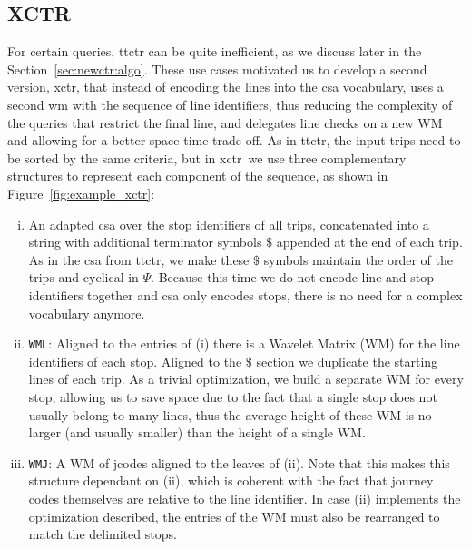     \subsection{XCTR}
    \label{sec:newctr:str:xctr}
    For certain queries, \gls{ttctr} can be quite inefficient, as we discuss later in the Section~\ref{sec:newctr:algo}. These use cases motivated us to develop a second version, \gls{xctr}, that instead of encoding the lines into the \gls{csa} vocabulary, uses a second \gls{wm} with the sequence of line identifiers, thus reducing the complexity of the queries that restrict the final line, and delegates line checks on a new WM and allowing for a better space-time trade-off. As in \gls{ttctr}, the input trips need to be sorted by the same criteria, but in \gls{xctr}~we use three complementary structures to represent each component of the sequence, as shown in Figure~\ref{fig:example_xctr}:
    \begin{enumerate}[(i)]
        \item An adapted \gls{csa} over the stop identifiers of all trips, concatenated into a string with additional terminator symbols $\$$ appended at the end of each trip. As in the \gls{csa} from \gls{ttctr}, we make these $\$$ symbols maintain the order of the trips and cyclical in $\Psi$. Because this time we do not encode line and stop identifiers together and \gls{csa} only encodes stops, there is no need for a complex vocabulary anymore.
        \item \texttt{WML}: Aligned to the entries of (i) there is a Wavelet Matrix (WM) for the line identifiers of each stop. Aligned to the $\$$ section we duplicate the starting lines of each trip. As a trivial optimization, we build a separate WM for every stop, allowing us to save space due to the fact that a single stop does not usually belong to many lines, thus the average height of these WM is no larger (and usually smaller) than the height of a single WM.
        \item \texttt{WMJ}: A WM of jcodes aligned to the leaves of (ii). Note that this makes this structure dependant on (ii), which is coherent with the fact that journey codes themselves are relative to the line identifier. In case (ii) implements the optimization described, the entries of the WM must also be rearranged to match the delimited stops.
    \end{enumerate}
    
